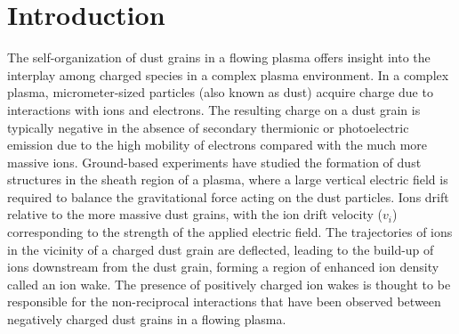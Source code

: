 \documentclass[aip,amsmath,amssymb,graphicx,floatfix,reprint]{revtex4-1}
\begin{document}
\pacs{}%
\maketitle %

\section{Introduction}
\label{intro}
The self-organization of dust grains in a flowing plasma offers insight into the interplay among charged species in a complex plasma environment.  In a complex plasma, micrometer-sized particles (also known as dust) acquire charge due to interactions with ions and electrons.  The resulting charge on a dust grain is typically negative in the absence of secondary thermionic or photoelectric emission due to the high mobility of electrons compared with the much more massive ions.  Ground-based experiments have studied the formation of dust structures in the sheath region of a plasma\cite{Kompaneets2007}, where a large vertical electric field is required to balance the gravitational force acting on the dust particles.  Ions drift relative to the more massive dust grains, with the ion drift velocity ($v_i$) corresponding to the strength of the applied electric field.  The trajectories of ions in the vicinity of a charged dust grain are deflected, leading to the build-up of ions downstream from the dust grain, forming a region of enhanced ion density called an ion wake.  The presence of positively charged ion wakes is thought to be responsible for the non-reciprocal interactions that have been observed between negatively charged dust grains in a flowing plasma\cite{Ivlev2015, Kliushnychenko2017}.
\end{document}

